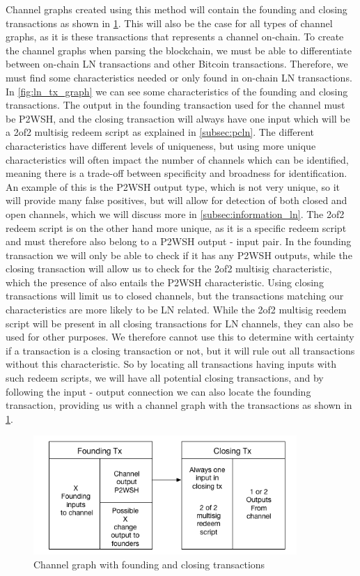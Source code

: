 Channel graphs created using this method will contain the founding and closing transactions as shown in \cref{fig:ln_tx_graph_small}.
This will also be the case for all types of channel graphs, as it is these transactions that represents a channel on-chain.
To create the channel graphs when parsing the blockchain, we must be able to differentiate between on-chain LN transactions and other Bitcoin transactions. Therefore, we must find some characteristics needed or only found in on-chain LN transactions. 
In \cref{fig:ln_tx_graph} we can see some characteristics of the founding and closing transactions.
The output in the founding transaction used for the channel must be P2WSH, and the closing transaction will always have one input which will be a 2of2 multisig redeem script as explained in \cref{subsec:pcln}. The different characteristics have different levels of uniqueness, but using more unique characteristics will often impact the number of channels which can be identified, meaning there is a trade-off between specificity and broadness for identification. An example of this is the P2WSH output type, which is not very unique, so it will provide many false positives, but will allow for detection of both closed and open channels, which we will discuss more in \cref{subsec:information_ln}. 
The 2of2 redeem script is on the other hand more unique, as it is a specific redeem script and must therefore also belong to a P2WSH output - input pair. In the founding transaction we will only be able to check if it has any P2WSH outputs, while the closing transaction will allow us to check for the 2of2 multisig characteristic, which the presence of also entails the P2WSH characteristic.
Using closing transactions will limit us to closed channels, but the transactions matching our characteristics are more likely to be LN related. While the 2of2 multisig reedem script will be present in all closing transactions for LN channels, they can also be used for other purposes. We therefore cannot use this to determine with certainty if a transaction is a closing transaction or not, but it will rule out all transactions without this characteristic. So by locating all transactions having inputs with such redeem scripts, we will have all potential closing transactions, and by following the input - output connection we can also locate the founding transaction, providing us with a channel graph with the transactions as shown in \cref{fig:ln_tx_graph_small}.

\begin{figure}[h]
    \centering
    \includegraphics[width=10cm]{figures/ln_tx_graph_small.png}
    \caption{Channel graph with founding and closing transactions}
    \label{fig:ln_tx_graph_small}
\end{figure}

